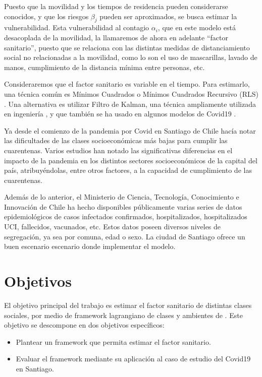 \begin{intro}
Puesto que la movilidad y los tiempos de residencia pueden considerarse conocidos, y que los riesgos \(\beta_j\) pueden ser aproximados, se busca estimar la vulnerabilidad. Esta vulnerabilidad al contagio \(\alpha_i\), que en este modelo está desacoplada de la movilidad, la llamaremos de ahora en adelante ``factor sanitario'', puesto que se relaciona con las distintas medidas de distanciamiento social no relacionadas a la movilidad, como lo son el uso de mascarillas, lavado de manos, cumplimiento de la distancia mínima entre personas, etc.

Consideraremos que el factor sanitario es variable en el tiempo. Para estimarlo, una técnica común es Mínimos Cuadrados o Mínimos Cuadrados Recursivo (RLS) \cite{Sameni2020}\cite{Piccolomini2020}.
Una alternativa es utilizar Filtro de Kalman, una técnica ampliamente utilizada en ingeniería \cite{Auger2013}, y que también se ha usado en algunos modelos de Covid19 \cite{Hasan2020}\cite{Song2021}\cite{Sameni2020}.

Ya desde el comienzo de la pandemia por Covid en Santiago de Chile \cite{Olivares2020} hacía notar las dificultades de las clases socioeconómicas más bajas para cumplir las cuarentenas.
Varios estudios \cite{Mena2021}\cite{Bennett2021}\cite{Gozzi2021} han notado las significativas diferencias en el impacto de la pandemia en los distintos sectores socioeconómicos de la capital del país, atribuyéndolas, entre otros factores, a la capacidad de cumplimiento de las cuarentenas. 

Además de lo anterior, el Ministerio de Ciencia, Tecnología, Conocimiento e Innovación de Chile ha hecho disponibles públicamente \cite{MINCIENCIA} varias series de datos epidemiológicos de casos infectados confirmados, hospitalizados, hospitalizados UCI, fallecidos, vacunados, etc. Estos datos poseen diversos niveles de segregación, ya sea por comuna, edad o sexo. La ciudad de Santiago ofrece un buen escenario escenario donde implementar el modelo.

\section*{Objetivos}

El objetivo principal del trabajo es estimar el factor sanitario de distintas clases sociales, por medio de framework lagrangiano de clases y ambientes de \cite{Bichara2018}. Este objetivo se descompone en dos objetivos específicos:
\begin{itemize}
    \item Plantear un framework que permita estimar el factor sanitario.
    \item Evaluar el framework mediante su aplicación al caso de estudio del Covid19 en Santiago.
\end{itemize}



\end{intro}
